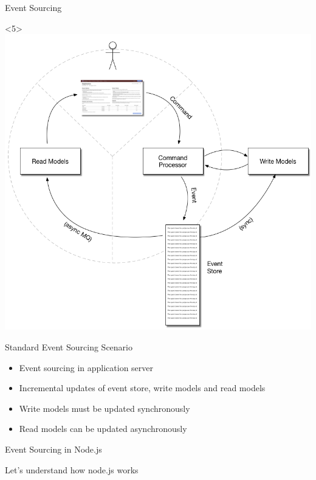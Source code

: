 \begin{frame}[fragile]{Event Sourcing}
\begin{onlyenv}<5>
\includegraphics[width=.7\textwidth]{../EventSourcing4.png}
\end{onlyenv}

\end{frame}

\begin{frame}[fragile]{Standard Event Sourcing Scenario}

\begin{itemize}
\item Event sourcing in application server
\item Incremental updates of event store, write models and read models
\item Write models must be updated synchronously
\item Read models can be updated asynchronously
\end{itemize}

\end{frame}

\begin{frame}[fragile]{Event Sourcing in Node.js}

Let's understand how node.js works

\end{frame}

